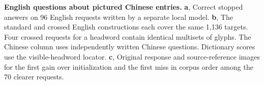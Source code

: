 \textbf{English questions about pictured Chinese entries.}
\textbf{a}, Correct stopped answers on 96 English requests written by a separate local model. \textbf{b}, The standard and crossed English constructions each cover the same 1,136 targets. Four crossed requests for a headword contain identical multisets of glyphs. The Chinese column uses independently written Chinese questions. Dictionary scores use the visible-headword locator. \textbf{c}, Original response and source-reference images for the first gain over initialization and the first miss in corpus order among the 70 clearer requests.
